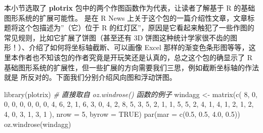 \documentclass[
  b5paper,
  UTF8,twoside]{book}
\newenvironment{Shaded}{\begin{snugshade}}{\end{snugshade}}
\newcommand{\AttributeTok}[1]{\textcolor[rgb]{0.77,0.63,0.00}{#1}}
\newcommand{\CommentTok}[1]{\textcolor[rgb]{0.56,0.35,0.01}{\textit{#1}}}
\newcommand{\ConstantTok}[1]{\textcolor[rgb]{0.00,0.00,0.00}{#1}}
\newcommand{\DecValTok}[1]{\textcolor[rgb]{0.00,0.00,0.81}{#1}}
\newcommand{\FloatTok}[1]{\textcolor[rgb]{0.00,0.00,0.81}{#1}}
\newcommand{\FunctionTok}[1]{\textcolor[rgb]{0.00,0.00,0.00}{#1}}
\newcommand{\NormalTok}[1]{#1}
\newcommand{\OtherTok}[1]{\textcolor[rgb]{0.56,0.35,0.01}{#1}}
\begin{document}
本小节选取了 \textbf{plotrix} 包中的两个作图函数作为代表，让读者了解基于 R 的基础图形系统的扩展可能性。\citet{Lemon06} 是在 R
News 上关于这个包的一篇介绍性文章，文章标题将这个包描述为''（它）位于 R 的红灯区''，原因是它看起来触犯了一些作图的常见规则，比如它扩展了饼图（甚至还有 3D 饼图这种统计学家很不齿的图形！）、介绍了如何将坐标轴截断、可以画像 Excel 那样的渐变色条形图等等，这里本作者也不知该包的作者究竟是开玩笑还是认真的，总之这个包的确显示了 R 基础图形系统的扩展性，但一些扩展的方向需要我们三思，例如截断坐标轴的作法就是 \citet{Cleveland85} 所反对的。下面我们分别介绍风向图和浮动饼图。





\begin{Shaded}
\begin{Highlighting}[]
\FunctionTok{library}\NormalTok{(plotrix) }\CommentTok{\# 直接取自 oz.windrose() 函数的例子}
\NormalTok{windagg }\OtherTok{\textless{}{-}} \FunctionTok{matrix}\NormalTok{(}\FunctionTok{c}\NormalTok{(}
  \DecValTok{8}\NormalTok{, }\DecValTok{0}\NormalTok{, }\DecValTok{0}\NormalTok{, }\DecValTok{0}\NormalTok{, }\DecValTok{0}\NormalTok{, }\DecValTok{0}\NormalTok{, }\DecValTok{0}\NormalTok{, }
  \DecValTok{0}\NormalTok{, }\DecValTok{4}\NormalTok{, }\DecValTok{6}\NormalTok{, }\DecValTok{2}\NormalTok{, }\DecValTok{1}\NormalTok{, }\DecValTok{6}\NormalTok{, }\DecValTok{3}\NormalTok{, }
  \DecValTok{0}\NormalTok{, }\DecValTok{4}\NormalTok{, }\DecValTok{2}\NormalTok{, }\DecValTok{8}\NormalTok{, }\DecValTok{5}\NormalTok{, }\DecValTok{3}\NormalTok{, }\DecValTok{5}\NormalTok{, }
  \DecValTok{2}\NormalTok{, }\DecValTok{1}\NormalTok{, }\DecValTok{1}\NormalTok{, }\DecValTok{5}\NormalTok{, }\DecValTok{5}\NormalTok{, }\DecValTok{2}\NormalTok{, }\DecValTok{4}\NormalTok{, }
  \DecValTok{1}\NormalTok{, }\DecValTok{4}\NormalTok{, }\DecValTok{1}\NormalTok{, }\DecValTok{2}\NormalTok{, }\DecValTok{1}\NormalTok{, }\DecValTok{2}\NormalTok{, }\DecValTok{4}\NormalTok{, }
  \DecValTok{0}\NormalTok{, }\DecValTok{3}\NormalTok{, }\DecValTok{1}\NormalTok{, }\DecValTok{3}\NormalTok{, }\DecValTok{1}
\NormalTok{), }\AttributeTok{nrow =} \DecValTok{5}\NormalTok{, }\AttributeTok{byrow =} \ConstantTok{TRUE}\NormalTok{)}
\FunctionTok{par}\NormalTok{(}\AttributeTok{mar =} \FunctionTok{c}\NormalTok{(}\FloatTok{0.5}\NormalTok{, }\FloatTok{0.5}\NormalTok{, }\FloatTok{4.0}\NormalTok{, }\FloatTok{0.5}\NormalTok{))}
\FunctionTok{oz.windrose}\NormalTok{(windagg)}
\end{Highlighting}
\end{Shaded}
\end{document}
